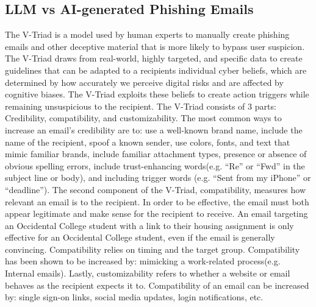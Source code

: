 \documentclass[10pt,twocolumn]{article}
\begin{document}
\subsection{LLM vs AI-generated Phishing Emails}
The V-Triad is a model used by human experts to manually create phishing emails and other deceptive material that is more likely to bypass user suspicion. The V-Triad draws from real-world, highly targeted, and specific data to create guidelines that can be adapted to a recipients individual cyber beliefs, which are determined by how accurately we perceive digital risks and are affected by cognitive biases. The V-Triad exploits these beliefs to create action triggers while remaining unsuspicious to the recipient. The V-Triad consists of 3 parts: Credibility, compatibility, and customizability. The most common ways to increase an email’s credibility are to: use a well-known brand name, include the name of the recipient, spoof a known sender, use colors, fonts, and text that mimic familiar brands, include familiar attachment types, presence or absence of obvious spelling errors, include trust-enhancing words(e.g. “Re” or “Fwd” in the subject line or body), and including trigger words (e.g. “Sent from my iPhone” or “deadline”). The second component of the V-Triad, compatibility, measures how relevant an email is to the recipient. In order to be effective, the email must both appear legitimate and make sense for the recipient to receive. An email targeting an Occidental College student with a link to their housing assignment is only effective for an Occidental College student, even if the email is generally convincing. Compatibility relies on timing and the target group. Compatibility has been shown to be increased by: mimicking a work-related process(e.g. Internal emails). Lastly, customizability refers to whether a website or email behaves as the recipient expects it to. Compatibility of an email can be increased by: single sign-on links, social media updates, login notifications, etc.
\end{document}
